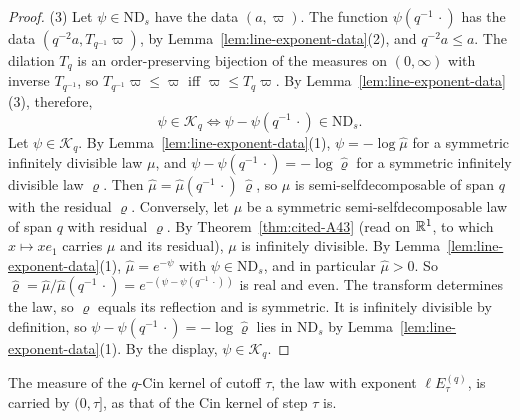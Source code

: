 \begin{proof}
(3) Let $\psi \in \mathrm{ND}_s$ have the data $(a, \varpi)$. The function
$\psi(q^{-1}\,\cdot)$ has the data $(q^{-2}a, T_{q^{-1}}\varpi)$, by
Lemma~\ref{lem:line-exponent-data}(2), and $q^{-2}a \le a$. The dilation $T_q$ is an order-preserving
bijection of the measures on $(0,\infty)$ with inverse $T_{q^{-1}}$, so $T_{q^{-1}}\varpi \le \varpi$
iff $\varpi \le T_q\varpi$. By Lemma~\ref{lem:line-exponent-data}(3), therefore,
\[
  \psi \in \mathcal{K}_q \iff \psi - \psi(q^{-1}\,\cdot) \in \mathrm{ND}_s .
\]
Let $\psi \in \mathcal{K}_q$. By Lemma~\ref{lem:line-exponent-data}(1), $\psi = -\log\widehat\mu$
for a symmetric infinitely divisible law $\mu$, and $\psi - \psi(q^{-1}\,\cdot) = -\log\widehat\varrho$
for a symmetric infinitely divisible law $\varrho$. Then
$\widehat\mu = \widehat\mu(q^{-1}\,\cdot)\,\widehat\varrho$, so $\mu$ is semi-selfdecomposable of
span $q$ with the residual $\varrho$. Conversely, let $\mu$ be a symmetric semi-selfdecomposable law
of span $q$ with residual $\varrho$. By Theorem~\ref{thm:cited-A43} (read on $\mathbb{R}^1$, to which $x \mapsto xe_1$ carries $\mu$ and its
residual), $\mu$ is infinitely divisible. By
Lemma~\ref{lem:line-exponent-data}(1), $\widehat\mu = e^{-\psi}$ with $\psi \in \mathrm{ND}_s$, and
in particular $\widehat\mu > 0$. So
$\widehat\varrho = \widehat\mu/\widehat\mu(q^{-1}\,\cdot) = e^{-(\psi - \psi(q^{-1}\,\cdot))}$ is real
and even. The transform determines the law, so $\varrho$ equals its reflection and is symmetric. It
is infinitely divisible by definition, so $\psi - \psi(q^{-1}\,\cdot) = -\log\widehat\varrho$ lies
in $\mathrm{ND}_s$ by Lemma~\ref{lem:line-exponent-data}(1). By the display, $\psi \in \mathcal{K}_q$.
\end{proof}

The \Levy{} measure of the $q$-Cin kernel of cutoff $\tau$, the law with exponent
$\ell E^{(q)}_\tau$, is carried by $(0,\tau]$, as that of the Cin kernel of step $\tau$ is.

